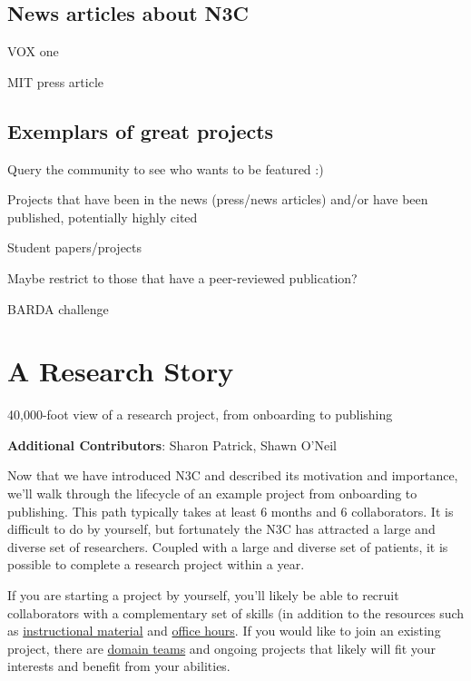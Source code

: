 \documentclass[
  letterpaper,
  DIV=11,
  numbers=noendperiod]{scrreprt}
\begin{document}
\hypertarget{news-articles-about-n3c}{%
\section{News articles about N3C}\label{news-articles-about-n3c}}

VOX one

MIT press article

\hypertarget{exemplars-of-great-projects}{%
\section{Exemplars of great
projects}\label{exemplars-of-great-projects}}

Query the community to see who wants to be featured :)

Projects that have been in the news (press/news articles) and/or have
been published, potentially highly cited

Student papers/projects

Maybe restrict to those that have a peer-reviewed publication?

BARDA challenge

\hypertarget{sec-story}{%
\chapter{A Research Story}\label{sec-story}}

40,000-foot view of a research project, from onboarding to publishing

\hfill\break

\textbf{Additional Contributors}: Sharon
Patrick\href{https://orcid.org/0000-0001-6535-2013}{},
Shawn O'Neil\href{https://orcid.org/0000-0001-6220-7080}{}

Now that we have introduced N3C and described its motivation and
importance, we'll walk through the lifecycle of an example project from
onboarding to publishing. This path typically takes at least 6 months
and 6 collaborators. It is difficult to do by yourself, but fortunately
the N3C has attracted a large and diverse set of researchers. Coupled
with a large and diverse set of patients, it is possible to complete a
research project within a year.

If you are starting a project by yourself, you'll likely be able to
recruit collaborators with a complementary set of skills (in addition to
the resources such as \protect\hyperlink{sec-support}{instructional
material} and \protect\hyperlink{sec-support-office}{office hours}. If
you would like to join an existing project, there are
\protect\hyperlink{domain-teams}{domain teams} and ongoing projects that
likely will fit your interests and benefit from your abilities.
\end{document}
